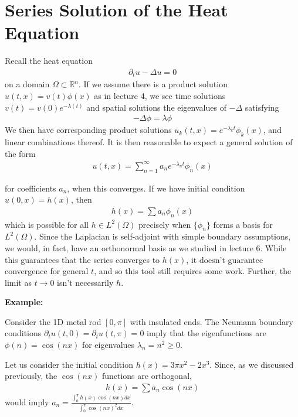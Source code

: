 \documentclass{article}
\newcommand{\R}{{\mathbb{R}}}
\newcommand{\pd}{\partial}
\begin{document}
	\section{Series Solution of the Heat Equation}
	
	Recall the heat equation 
	\begin{align*}
		\pd_{t}u - \Delta u = 0
	\end{align*}
	on a domain $\Omega \subset \R^{n}$. If we assume there is a product solution $u(t,x) = v(t)\phi(x)$ as in lecture 4, we see time solutions $v(t) = v(0) e^{-\lambda(t)}$ and spatial solutions the eigenvalues of $-\Delta$ satisfying 
	\begin{align*}
		-\Delta \phi = \lambda \phi
	\end{align*}
	We then have corresponding product solutions $u_{k}(t,x) = e^{-\lambda_{k}t} \phi_{k}(x)$, and linear combinations thereof. It is then reasonable to expect a general solution of the form 
	\begin{align*}
		u(t,x) = \sum_{n=1}^{\infty} a_{n} e^{-\lambda_{n} t}\phi_{n}(x)
	\end{align*}
	
	for coefficients $a_{n}$, when this converges. If we have initial condition $u(0,x) = h(x)$, then 
	\begin{align*}
		h(x) = \sum a_{n} \phi_{n}(x)
	\end{align*}
	which is possible for all $h \in L^{2}(\Omega)$ precisely when $\{\phi_{n}\}$ forms a basis for $L^{2}(\Omega)$. Since the Laplacian is self-adjoint with simple boundary assumptions, we would, in fact, have an orthonormal basis as we studied in lecture 6. While this guarantees that the series converges to $h(x)$, it doesn't guarantee convergence for general $t$, and so this tool still requires some work. Further, the limit as $t \to 0$ isn't necessarily $h$. 
	
	
	\vspace{0.25 cm}
	
	\textbf{Example:}
	
	Consider the 1D metal rod $[0,\pi]$ with insulated ends. The Neumann boundary conditions $\pd_{t} u(t,0) = \pd_{t}u (t,\pi) = 0$ imply that the eigenfunctions are $\phi(n) = \cos(nx)$ for eigenvalues $\lambda_{n} = n^{2} \geq 0$.
	
	Let us consider the initial condition $h(x) = 3\pi x^{2} - 2x^{3}$. Since, as we discussed previously, the $\cos(nx)$ functions are orthogonal, 
	\begin{align*}
		h(x) = \sum a_{n} \cos(nx)
	\end{align*}
	would imply $a_{n} = \frac{\int_{0}^{\pi} h(x)\cos(nx) dx}{\int_{0}^{\pi} \cos(nx)^{2} dx}$. 
	
\end{document}
